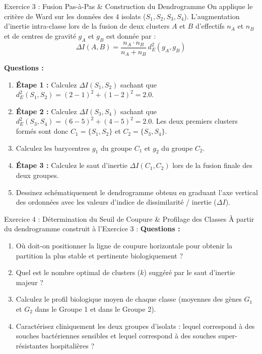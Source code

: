 \documentclass[11pt,a4paper]{article}
\begin{document}
\begin{exercicebox}{Exercice 3 : Fusion Pas-à-Pas \& Construction du Dendrogramme}
On applique le critère de Ward sur les données des 4 isolats ($S_1, S_2, S_3, S_4$).
L'augmentation d'inertie intra-classe lors de la fusion de deux clusters $A$ et $B$ d'effectifs $n_A$ et $n_B$ et de centres de gravité $g_A$ et $g_B$ est donnée par :
\begin{equation*}
  \Delta I(A, B) = \frac{n_A \cdot n_B}{n_A + n_B} \, d_E^2(g_A, g_B)
\end{equation*}

\textbf{Questions :}
\begin{enumerate}[label=\textbf{\alph*.}]
  \item \textbf{Étape 1 :} Calculez $\Delta I(S_1, S_2)$ sachant que $d_E^2(S_1, S_2) = (2-1)^2 + (1-2)^2 = 2.0$.
  \item \textbf{Étape 2 :} Calculez $\Delta I(S_3, S_4)$ sachant que $d_E^2(S_3, S_4) = (6-5)^2 + (4-5)^2 = 2.0$.
  Les deux premiers clusters formés sont donc $C_1 = \{S_1, S_2\}$ et $C_2 = \{S_3, S_4\}$.
  \item Calculez les barycentres $g_1$ du groupe $C_1$ et $g_2$ du groupe $C_2$.
  \item \textbf{Étape 3 :} Calculez le saut d'inertie $\Delta I(C_1, C_2)$ lors de la fusion finale des deux groupes.
  \item Dessinez schématiquement le dendrogramme obtenu en graduant l'axe vertical des ordonnées avec les valeurs d'indice de dissimilarité / inertie ($\Delta I$).
\end{enumerate}
\end{exercicebox}

\begin{exercicebox}{Exercice 4 : Détermination du Seuil de Coupure \& Profilage des Classes}
À partir du dendrogramme construit à l'Exercice 3 :
\textbf{Questions :}
\begin{enumerate}[label=\textbf{\alph*.}]
  \item Où doit-on positionner la ligne de coupure horizontale pour obtenir la partition la plus stable et pertinente biologiquement ?
  \item Quel est le nombre optimal de clusters ($k$) suggéré par le saut d'inertie majeur ?
  \item Calculez le profil biologique moyen de chaque classe (moyennes des gènes $G_1$ et $G_2$ dans le Groupe 1 et dans le Groupe 2).
  \item Caractérisez cliniquement les deux groupes d'isolats : lequel correspond à des souches bactériennes sensibles et lequel correspond à des souches super-résistantes hospitalières ?
\end{enumerate}
\end{exercicebox}
\end{document}
